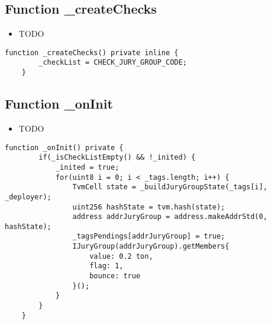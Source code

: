 \subsection{Function \_{}createChecks}

\begin{itemize}
\item TODO
\end{itemize}

\begin{lstlisting}[firstnumber=17]
    function _createChecks() private inline {
        _checkList = CHECK_JURY_GROUP_CODE;
    }
\end{lstlisting}

\subsection{Function \_{}onInit}

\begin{itemize}
\item TODO
\end{itemize}

\begin{lstlisting}[firstnumber=47]
    function _onInit() private {
        if(_isCheckListEmpty() && !_inited) {
            _inited = true;
            for(uint8 i = 0; i < _tags.length; i++) {
                TvmCell state = _buildJuryGroupState(_tags[i], _deployer);
                uint256 hashState = tvm.hash(state);
                address addrJuryGroup = address.makeAddrStd(0, hashState);
                _tagsPendings[addrJuryGroup] = true;
                IJuryGroup(addrJuryGroup).getMembers{
                    value: 0.2 ton,
                    flag: 1,
                    bounce: true
                }();
            }
        }
    }
\end{lstlisting}
